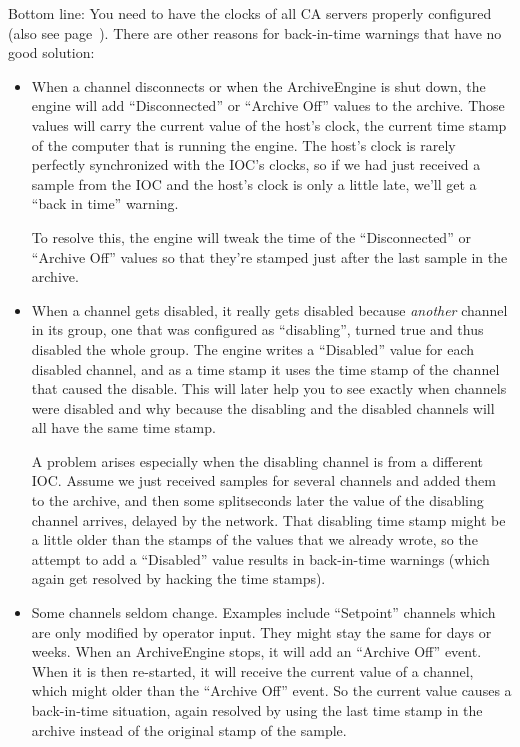 Bottom line: You need to have the clocks of all CA servers properly configured
(also see page~\pageref{back:in:time}).
There are other reasons for back-in-time warnings that have no good
solution:
\begin{itemize}
\item When a channel disconnects or when the ArchiveEngine is shut
  down, the engine will add ``Disconnected'' or ``Archive Off'' values
  to the archive. Those values will carry the current value of the
  host's clock, the current time stamp of the computer that is running
  the engine. The host's clock is rarely perfectly synchronized with
  the IOC's clocks, so if we had just received a sample from the IOC
  and the host's clock is only a little late, we'll get a ``back in
  time'' warning.

  To resolve this, the engine will tweak the time of the
  ``Disconnected'' or ``Archive Off'' values so that they're stamped
  just after the last sample in the archive.

\item When a channel gets disabled, it really gets disabled because
  \emph{another} channel in its group, one that was configured as
  ``disabling'', turned true and thus disabled the whole group.
  The engine writes a ``Disabled'' value for each disabled channel,
  and as a time stamp it uses the time stamp of the channel that
  caused the disable.
  This will later help you to see exactly when channels were disabled
  and why because the disabling and the disabled channels will all
  have the same time stamp.

  A problem arises especially when the disabling channel is from a
  different IOC. Assume we just received samples for several channels
  and added them to the archive, and then some splitseconds later the
  value of the disabling channel arrives, delayed by the network. That
  disabling time stamp might be a little older than the stamps of the
  values that we already wrote, so the attempt to add a ``Disabled''
  value results in back-in-time warnings (which again get resolved by
  hacking the time stamps).

\item Some channels seldom change. Examples include ``Setpoint''
  channels which are only modified by operator input. They might stay
  the same for days or weeks.
  When an ArchiveEngine stops, it will add an ``Archive Off''
  event. When it is then re-started, it will receive the current
  value of a channel, which might older than the
  ``Archive Off'' event. So the current value causes a back-in-time
  situation, again resolved by using the last time stamp in the
  archive instead of the original stamp of the sample.
\end{itemize}

